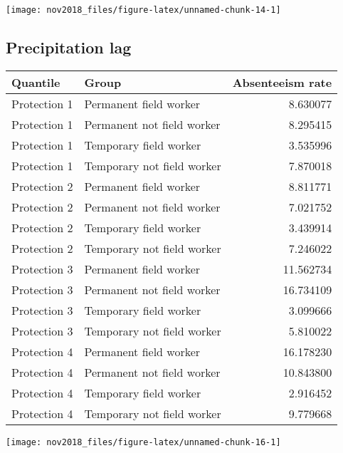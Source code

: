 \documentclass[]{article}
\begin{document}
\begin{center}\texttt{[image: nov2018\_files/figure-latex/unnamed-chunk-14-1]} \end{center}

\newpage

\subsection{Precipitation lag}\label{precipitation-lag}

\begin{tabular}{l|l|r}
\hline
Quantile & Group & Absenteeism rate\\
\hline
Protection 1 & Permanent field worker & 8.630077\\
\hline
Protection 1 & Permanent not field worker & 8.295415\\
\hline
Protection 1 & Temporary field worker & 3.535996\\
\hline
Protection 1 & Temporary not field worker & 7.870018\\
\hline
Protection 2 & Permanent field worker & 8.811771\\
\hline
Protection 2 & Permanent not field worker & 7.021752\\
\hline
Protection 2 & Temporary field worker & 3.439914\\
\hline
Protection 2 & Temporary not field worker & 7.246022\\
\hline
Protection 3 & Permanent field worker & 11.562734\\
\hline
Protection 3 & Permanent not field worker & 16.734109\\
\hline
Protection 3 & Temporary field worker & 3.099666\\
\hline
Protection 3 & Temporary not field worker & 5.810022\\
\hline
Protection 4 & Permanent field worker & 16.178230\\
\hline
Protection 4 & Permanent not field worker & 10.843800\\
\hline
Protection 4 & Temporary field worker & 2.916452\\
\hline
Protection 4 & Temporary not field worker & 9.779668\\
\hline
\end{tabular}

\begin{center}\texttt{[image: nov2018\_files/figure-latex/unnamed-chunk-16-1]} \end{center}

\newpage
\end{document}
